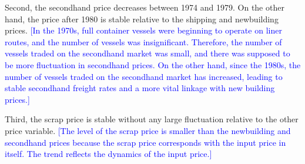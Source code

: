 \documentclass[11pt]{article}
\begin{document}
Second, the secondhand price decreases between 1974 and 1979. On the other hand, the price after 1980 is stable relative to the shipping and newbuilding prices. \textcolor{blue}{[In the 1970s, full container vessels were beginning to operate on liner routes, and the number of vessels was insignificant. Therefore, the number of vessels traded on the secondhand market was small, and there was supposed to be more fluctuation in secondhand prices. On the other hand, since the 1980s, the number of vessels traded on the secondhand market has increased, leading to stable secondhand freight rates and a more vital linkage with new building prices.]}

Third, the scrap price is stable without any large fluctuation relative to the other price variable. \textcolor{blue}{[The level of the scrap price is smaller than the newbuilding and secondhand prices because the scrap price corresponds with the input price in itself. The trend reflects the dynamics of the input price.]}


\end{document}
